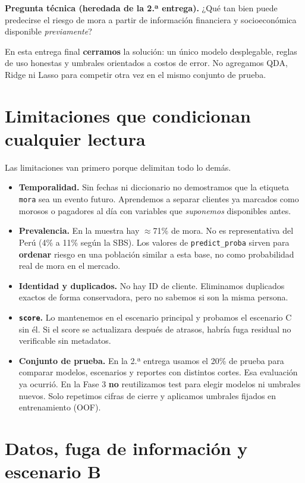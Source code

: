 \documentclass[11pt]{article}
\begin{document}
\textbf{Pregunta técnica (heredada de la 2.ª entrega).} ¿Qué tan bien puede predecirse el riesgo de mora a partir de información financiera y socioeconómica disponible \emph{previamente}?

En esta entrega final \textbf{cerramos} la solución: un único modelo desplegable, reglas de uso honestas y umbrales orientados a costos de error. No agregamos QDA, Ridge ni Lasso para competir otra vez en el mismo conjunto de prueba.

\section{Limitaciones que condicionan cualquier lectura}

Las limitaciones van primero porque delimitan todo lo demás.

\begin{itemize}
\item \textbf{Temporalidad.} Sin fechas ni diccionario no demostramos que la etiqueta \texttt{mora} sea un evento futuro. Aprendemos a separar clientes ya marcados como morosos o pagadores al día con variables que \emph{suponemos} disponibles antes.
\item \textbf{Prevalencia.} En la muestra hay $\approx$71\% de mora. No es representativa del Perú (4\% a 11\% según la SBS). Los valores de \texttt{predict\_proba} sirven para \textbf{ordenar} riesgo en una población similar a esta base, no como probabilidad real de mora en el mercado.
\item \textbf{Identidad y duplicados.} No hay ID de cliente. Eliminamos duplicados exactos de forma conservadora, pero no sabemos si son la misma persona.
\item \textbf{\texttt{score}.} Lo mantenemos en el escenario principal y probamos el escenario C sin él. Si el score se actualizara después de atrasos, habría fuga residual no verificable sin metadatos.
\item \textbf{Conjunto de prueba.} En la 2.ª entrega usamos el 20\% de prueba para comparar modelos, escenarios y reportes con distintos cortes. Esa evaluación ya ocurrió. En la Fase 3 \textbf{no} reutilizamos test para elegir modelos ni umbrales nuevos. Solo repetimos cifras de cierre y aplicamos umbrales fijados en entrenamiento (OOF).
\end{itemize}

\section{Datos, fuga de información y escenario B}
\end{document}
